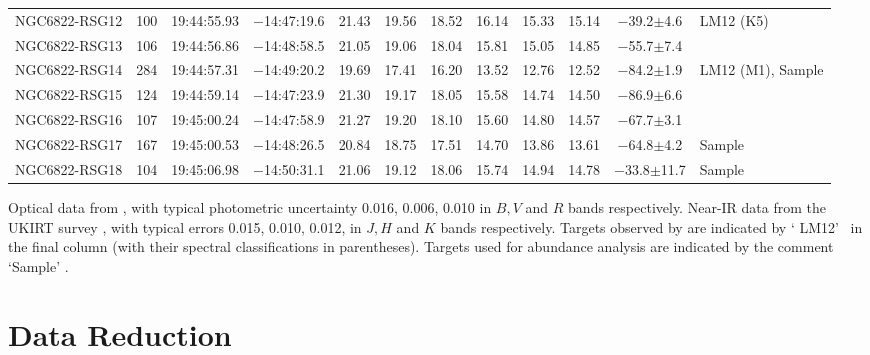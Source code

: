 \begin{table}
\begin{threeparttable}
\begin{tabular}{lrcccccccccl}
NGC6822-RSG12 & 100 &   19:44:55.93  &  $-$14:47:19.6  &  21.43  &  19.56  &  18.52  &  16.14  &  15.33  &  15.14  &  $-$39.2$\pm$4.6 & LM12 (K5) \\
NGC6822-RSG13 & 106 &   19:44:56.86  &  $-$14:48:58.5  &  21.05  &  19.06  &  18.04  &  15.81  &  15.05  &  14.85  &  $-$55.7$\pm$7.4 \\
NGC6822-RSG14 & 284 &   19:44:57.31  &  $-$14:49:20.2  &  19.69  &  17.41  &  16.20  &  13.52  &  12.76  &  12.52  &  $-$84.2$\pm$1.9 & LM12 (M1), Sample \\
NGC6822-RSG15 & 124 &   19:44:59.14  &  $-$14:47:23.9  &  21.30  &  19.17  &  18.05  &  15.58  &  14.74  &  14.50  &  $-$86.9$\pm$6.6 \\
NGC6822-RSG16 & 107 &   19:45:00.24  &  $-$14:47:58.9  &  21.27  &  19.20  &  18.10  &  15.60  &  14.80  &  14.57  &  $-$67.7$\pm$3.1 \\
NGC6822-RSG17 & 167 &   19:45:00.53  &  $-$14:48:26.5  &  20.84  &  18.75  &  17.51  &  14.70  &  13.86  &  13.61  &  $-$64.8$\pm$4.2 & Sample\\
NGC6822-RSG18 & 104 &   19:45:06.98  &  $-$14:50:31.1  &  21.06  &  19.12  &  18.06  &  15.74  &  14.94  &  14.78  &\a$-$33.8$\pm$11.7& Sample\\
\hline
\end{tabular}

\begin{tablenotes}
  \item Optical data from
  \protect\cite{2007AJ....134.2474M}, with typical photometric uncertainty 0.016, 0.006, 0.010 in $B, V$ and $R$ bands respectively.
  Near-IR data from the UKIRT survey
  \protect\cite[see][for details]{2012A&A...540A.135S}, with typical errors 0.015, 0.010, 0.012, in $J, H$ and $K$ bands respectively.
  Targets observed by
  \protect\cite{2012AJ....144....2L}
  are indicated by \textquoteleft
  LM12\textquoteright~ in the final column (with their spectral classifications in parentheses).
  Targets used for abundance analysis are indicated by the comment
  \textquoteleft Sample\textquoteright
  .
\end{tablenotes}
\end{threeparttable}
\end{table}



\section{Data Reduction} %
\label{sec:data_reduction}

